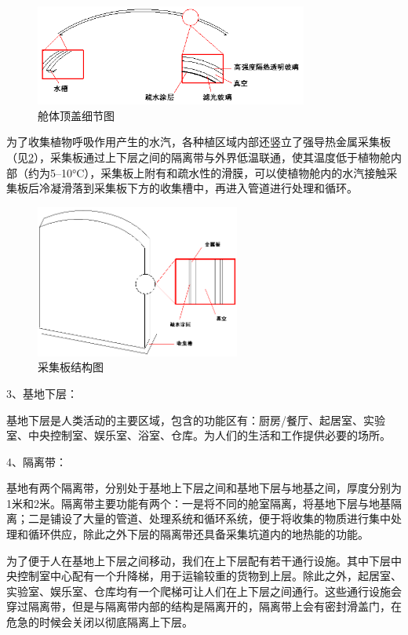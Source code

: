 \begin{figure}[H]
  \centering
  \includegraphics[width=0.8\textwidth]{figure/cabin-root.png}
  \caption{舱体顶盖细节图}
  \label{fig:cabin-root}
\end{figure}

为了收集植物呼吸作用产生的水汽，各种植区域内部还竖立了强导热金属采集板（见\cref{fig:collecting-broad}），采集板通过上下层之间的隔离带与外界低温联通，使其温度低于植物舱内部（约为5--10\si{\degreeCelsius}），采集板上附有和疏水性的滑膜，可以使植物舱内的水汽接触采集板后冷凝滑落到采集板下方的收集槽中，再进入管道进行处理和循环。

\begin{figure}[H]
  \centering
  \includegraphics[width=0.6\textwidth]{figure/collecting-broad.png}
  \caption{采集板结构图}
  \label{fig:collecting-broad}
\end{figure}

3、基地下层：

基地下层是人类活动的主要区域，包含的功能区有：厨房/餐厅、起居室、实验室、中央控制室、娱乐室、浴室、仓库。为人们的生活和工作提供必要的场所。

4、隔离带：

基地有两个隔离带，分别处于基地上下层之间和基地下层与地基之间，厚度分别为1米和2米。隔离带主要功能有两个：一是将不同的舱室隔离，将基地下层与地基隔离；二是铺设了大量的管道、处理系统和循环系统，便于将收集的物质进行集中处理和循环供应，除此之外下层的隔离带还具备采集坑道内的地热能的功能。

为了便于人在基地上下层之间移动，我们在上下层配有若干通行设施。其中下层中央控制室中心配有一个升降梯，用于运输较重的货物到上层。除此之外，起居室、实验室、娱乐室、仓库均有一个爬梯可让人们在上下层之间通行。这些通行设施会穿过隔离带，但是与隔离带内部的结构是隔离开的，隔离带上会有密封滑盖门，在危急的时候会关闭以彻底隔离上下层。


